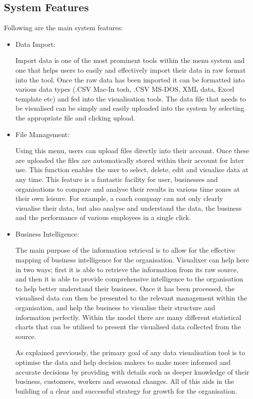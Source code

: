 \subsection{System Features}

Following are the main system features:

\begin{itemize}
\item Data Import:

Import data is one of the most prominent tools within the menu system and one that helps users to easily and effectively import their data in raw format into the tool. Once the raw data has been imported it can be formatted into various data types (.CSV Mac-In tosh, .CSV MS-DOS, XML data, Excel template etc) and fed into the visualisation tools. The data file that needs to be visualised can be simply and easily uploaded into the system by selecting the appropriate file and clicking upload.

\item File Management:

Using this menu, users can upload files directly into their account. Once these are uploaded the files are automatically stored within their account for later use. This function enables the user to select, delete, edit and visualise data at any time. This feature is a fantastic facility for user, businesses and organisations to compare and analyse their results in various time zones at their own leisure. For example, a coach company can not only clearly visualise their data, but also analyse and understand the data, the business and the performance of various employees in a single click. 

\item Business Intelligence:

The main purpose of the information retrieval is to allow for the effective mapping of business intelligence for the organisation. Visualixer can help here in two ways; first it is able to retrieve the information from its raw source, and then it is able to provide comprehensive intelligence to the organisation to help better understand their business. Once it has been processed, the visualised data can then be presented to the relevant management within the organisation, and help the business to visualise their structure and information perfectly. Within the model there are many different statistical charts that can be utilised to present the visualised data collected from the source. 

As explained previously, the primary goal of any data visualisation tool is to optimise the data and help decision makers to make more informed and accurate decisions by providing with details such as deeper knowledge of their business, customers, workers and seasonal changes. All of this aids in the building of a clear and successful strategy for growth for the organisation.
\end{itemize}

